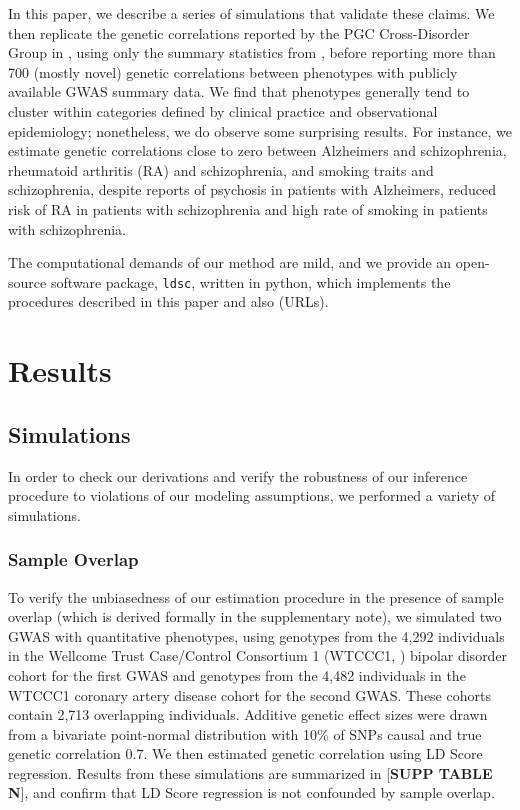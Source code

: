\documentclass[11pt]{article}
\numberwithin{equation}{section}
\begin{document}
In this paper, we describe a series of simulations that validate these claims. 
We then replicate the genetic correlations reported by the PGC Cross-Disorder Group in \cite{pgccdg2013},
using only the summary statistics from \cite{cross2013identification}, 
before reporting more than 700 (mostly novel) 
genetic correlations between phenotypes with publicly available GWAS summary data.
We find that phenotypes generally tend to cluster within categories defined by clinical practice and observational epidemiology; 
nonetheless, we do observe some surprising results.
For instance, we estimate genetic correlations close to zero between Alzheimers and schizophrenia,
rheumatoid arthritis (RA) and schizophrenia, and smoking traits and schizophrenia,
despite reports of psychosis in patients with Alzheimers, reduced risk of RA in patients with schizophrenia
and high rate of smoking in patients with schizophrenia.

The computational demands of our method are mild, and we provide an open-source software package, \texttt{ldsc},
written in python, which implements the procedures described in this paper and also 
\cite{buliksullivan2014, finucane2014partitioning} (URLs).


\section{Results}\label{Results}

\subsection{Simulations}
In order to check our derivations and verify the robustness of our inference procedure to 
violations of our modeling assumptions, we performed a variety of simulations. 

\subsubsection{Sample Overlap}
To verify the unbiasedness of our estimation procedure in the presence of sample overlap 
(which is derived formally in the supplementary note), 
we simulated two GWAS with quantitative phenotypes,
using genotypes from the 4,292 individuals in the Wellcome Trust Case/Control Consortium 1 
(WTCCC1, \cite{international2011genetic}) bipolar disorder cohort for the first GWAS
and genotypes from the 4,482 individuals in the WTCCC1 coronary artery disease cohort for the second GWAS.
These cohorts contain 2,713 overlapping individuals. 
Additive genetic effect sizes were drawn from a bivariate point-normal distribution 
with 10\% of SNPs causal and true genetic correlation $0.7$.
We then estimated genetic correlation using LD Score regression.
Results from these simulations are summarized in [\textbf{SUPP TABLE N}],
and confirm that LD Score regression is not confounded by sample overlap.
\end{document}
